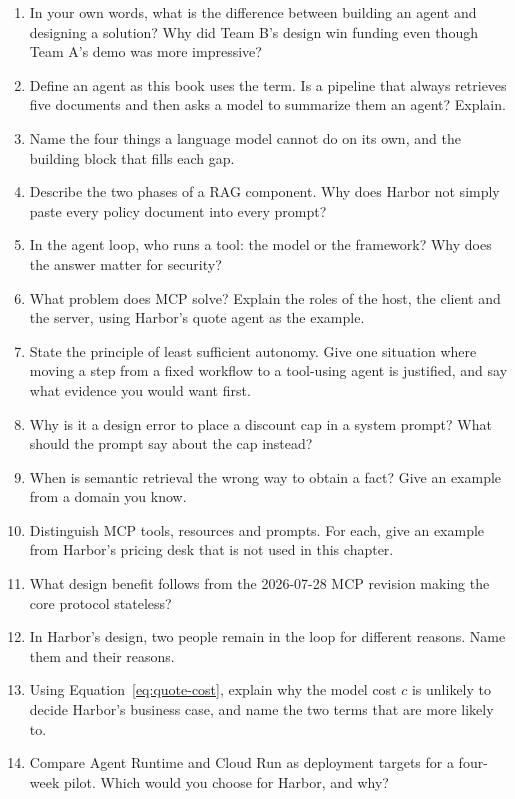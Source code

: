 \begin{enumerate}[itemsep=2pt]
  \item In your own words, what is the difference between building an agent and designing a solution? Why did Team B's design win funding even though Team A's demo was more impressive?
  \item Define an agent as this book uses the term. Is a pipeline that always retrieves five documents and then asks a model to summarize them an agent? Explain.
  \item Name the four things a language model cannot do on its own, and the building block that fills each gap.
  \item Describe the two phases of a RAG component. Why does Harbor not simply paste every policy document into every prompt?
  \item In the agent loop, who runs a tool: the model or the framework? Why does the answer matter for security?
  \item What problem does MCP solve? Explain the roles of the host, the client and the server, using Harbor's quote agent as the example.
  \item State the principle of least sufficient autonomy. Give one situation where moving a step from a fixed workflow to a tool-using agent is justified, and say what evidence you would want first.
  \item Why is it a design error to place a discount cap in a system prompt? What should the prompt say about the cap instead?
  \item When is semantic retrieval the wrong way to obtain a fact? Give an example from a domain you know.
  \item Distinguish MCP tools, resources and prompts. For each, give an example from Harbor's pricing desk that is not used in this chapter.
  \item What design benefit follows from the 2026-07-28 MCP revision making the core protocol stateless?
  \item In Harbor's design, two people remain in the loop for different reasons. Name them and their reasons.
  \item Using Equation~\eqref{eq:quote-cost}, explain why the model cost $c$ is unlikely to decide Harbor's business case, and name the two terms that are more likely to.
  \item Compare Agent Runtime and Cloud Run as deployment targets for a four-week pilot. Which would you choose for Harbor, and why?
\end{enumerate}

